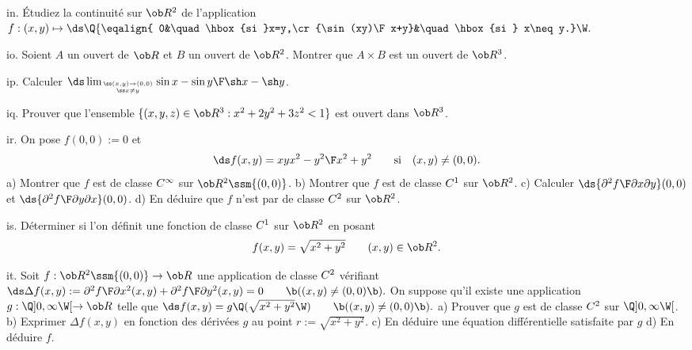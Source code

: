 \exo [Level=2,Fight=2,Learn=1,Type=\Exercices,Field=\Continuité,Origin=] in. 
\'Etudiez la continuité sur $\ob R^2$ de l'application 
$f:(x,y)\mapsto \ds\Q\{\eqalign{
0&\quad\hbox{si }x=y,\cr
{\sin(xy)\F x+y}&\quad\hbox{si } x\neq y.}\W.$

\exo [Level=2,Fight=0,Learn=1,Type=\Cours,Field=\Topologie,Origin=] io. 
Soient $A$ un ouvert de $\ob R$ et $B$ un ouvert de $\ob R^2$. 
Montrer que $A\times B$ est un ouvert de $\ob R^3$. 

\exo [Level=2,Fight=2,Learn=1,Type=\Exercices,Field=\Continuité,Origin=] ip. 
Calculer $\ds\lim_{\ss(x,y)\to(0,0)\atop\ss x\neq y}{\sin x-\sin y\F\sh x-\sh y}$. 

\exo [Level=2,Fight=0,Learn=1,Type=\Cours,Field=\Topologie,Origin=] iq. 
Prouver que l'ensemble $\{(x,y,z)\in\ob R^3:x^2+2y^2+3z^2<1\}$ est ouvert dans $\ob R^3$. 

\exo [Level=2,Fight=1,Learn=2,Type=\Cours,Field=\Dérivation,Origin=] ir. %
On pose $f(0,0):=0$ et $$
\ds f(x,y)=xy{x^2-y^2\F x^2+y^2}\qquad \hbox{si}\quad (x,y)\neq(0,0).
$$
a) Montrer que $f$ est de classe $\sc C^\infty$ sur $\ob R^2\ssm\{(0,0)\}$. \medskip\noindent
b) Montrer que $f$ est de classe $\sc C^1$ sur $\ob R^2$. \medskip\noindent
c) Calculer $\ds{\partial^2f\F\partial x\partial y}(0,0)$ et $\ds{\partial^2f\F\partial y\partial x}(0,0)$. \medskip\noindent
d) En déduire que $f$ n'est par de classe $\sc C^2$ sur $\ob R^2$. 


\exo [Level=2,Fight=0,Learn=1,Type=\TravauxDirigés,Field=\Dérivation,Origin=] is. 
Déterminer si l'on définit une fonction de classe $\sc C^1$ sur $\ob R^2$ en posant 
$$
f(x,y)=\sqrt{x^2+y^2}\qquad (x,y)\in\ob R^2.
$$ 


\exo [Level=2,Fight=2,Learn=2,Type=\TravauxDirigés,Field=\EquationsAuxDérivéesPartielles,Origin=] it. 
Soit $f:\ob R^2\ssm\{(0,0)\}\to\ob R$ une application de classe $\sc C^2$ 
vérifiant 
\medskip\hfill
$\ds
\Delta f(x,y):={\partial^2f\F\partial x^2}(x,y)+{\partial^2f\F\partial y^2}(x,y)=0\qquad\b((x,y)\neq(0,0)\b). 
$\hfill\null\medskip\noindent
On suppose qu'il existe une application $g:\Q]0,\infty\W[\to\ob R$ telle que 
\medskip\hfill$\ds 
f(x,y)=g\Q(\sqrt{x^2+y^2}\W)\qquad\b((x,y)\neq(0,0)\b).
$\hfill\null\medskip\noindent
a) Prouver que $g$ est de classe $\sc C^2$ sur $\Q]0,\infty\W[$. \smallskip
\noindent
b) Exprimer $\Delta f(x,y)$ en fonction des dérivées $g$ au point $r:=\sqrt{x^2+y^2}$. 
\smallskip\noindent 
c) En déduire une équation différentielle satisfaite par $g$
\smallskip\noindent
d) En déduire $f$. 

